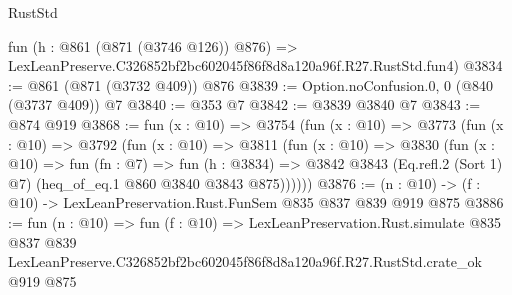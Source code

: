 \begin{lexlean}{RustStd}
\begin{coremodule}
    fun (h : @861 (@871 (@3746 @126)) @876) =>
    LexLeanPreserve.C326852bf2bc602045f86f8d8a120a96f.R27.RustStd.fun4)
@3834 := @861 (@871 (@3732 @409)) @876
@3839 := Option.noConfusion.{0, 0} (@840 (@3737 @409)) @7
@3840 := @353 @7
@3842 := @3839 @3840 @7
@3843 := @874 @919
@3868 := fun (x : @10) =>
  @3754
    (fun (x : @10) =>
    @3773
      (fun (x : @10) =>
      @3792
        (fun (x : @10) =>
        @3811
          (fun (x : @10) =>
          @3830
            (fun (x : @10) =>
            fun (fn : @7) =>
            fun (h : @3834) =>
            @3842 @3843 (Eq.refl.{2} (Sort 1) @7) (heq_of_eq.{1} @860 @3840 @3843 @875))))))
@3876 := (n : @10) -> (f : @10) -> LexLeanPreservation.Rust.FunSem @835 @837 @839 @919 @875
@3886 := fun (n : @10) =>
  fun (f : @10) =>
  LexLeanPreservation.Rust.simulate
    @835
    @837
    @839
    LexLeanPreserve.C326852bf2bc602045f86f8d8a120a96f.R27.RustStd.crate_ok
    @919
    @875
\end{coremodule}
\end{lexlean}
